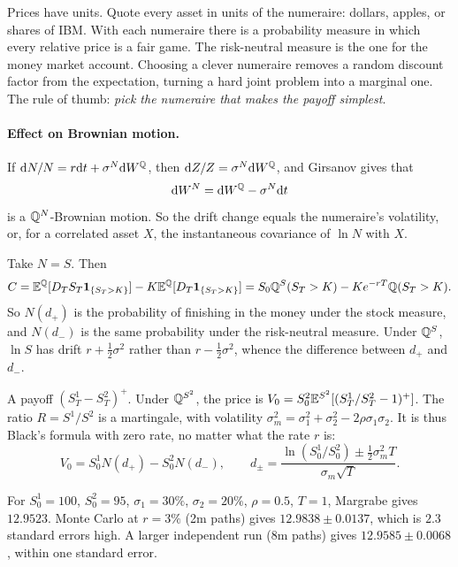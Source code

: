 \begin{intuition}
Prices have units. Quote every asset in units of the numeraire: dollars, apples, or shares of IBM. With each numeraire there is a probability measure in which every relative price is a fair game. The risk-neutral measure is the one for the money market account. Choosing a clever numeraire removes a random discount factor from the expectation, turning a hard joint problem into a marginal one. The rule of thumb: \emph{pick the numeraire that makes the payoff simplest}.
\end{intuition}

\paragraph{Effect on Brownian motion.} If $\mathrm{d} N/N=r\mathrm{d} t+\sigma^N\mathrm{d} W^{\mathbb{Q}}$, then $\mathrm{d} Z/Z=\sigma^N\mathrm{d} W^{\mathbb{Q}}$, and Girsanov gives that
\[
\mathrm{d} W^N=\mathrm{d} W^{\mathbb{Q}}-\sigma^N\mathrm{d} t
\]
is a $\mathbb{Q}^N$-Brownian motion. So the drift change equals the numeraire's volatility, or, for a correlated asset $X$, the instantaneous covariance of $\ln N$ with $X$.

\begin{example}
Take $N=S$. Then
\[
C=\mathbb{E}^{\mathbb{Q}}[D_TS_T\mathbf{1}_{\{S_T>K\}}]-K\mathbb{E}^{\mathbb{Q}}[D_T\mathbf{1}_{\{S_T>K\}}]=S_0\mathbb{Q}^S(S_T>K)-Ke^{-rT}\mathbb{Q}(S_T>K).
\]
So $N(d_+)$ is the probability of finishing in the money under the stock measure, and $N(d_-)$ is the same probability under the risk-neutral measure. Under $\mathbb{Q}^S$, $\ln S$ has drift $r+\tfrac12\sigma^2$ rather than $r-\tfrac12\sigma^2$, whence the difference between $d_+$ and $d_-$.
\end{example}

\begin{example}\label{ex:margrabe}
A payoff $(S^1_T-S^2_T)^+$. Under $\mathbb{Q}^{S^2}$, the price is $V_0=S^2_0\mathbb{E}^{S^2}[(S^1_T/S^2_T-1)^+]$. The ratio $R=S^1/S^2$ is a martingale, with volatility $\sigma_m^2=\sigma_1^2+\sigma_2^2-2\rho\sigma_1\sigma_2$. It is thus Black's formula with zero rate, no matter what the rate $r$ is:
\[
V_0=S^1_0N(d_+)-S^2_0N(d_-),\qquad d_\pm=\frac{\ln(S_0^1/S_0^2)\pm\frac12\sigma_m^2T}{\sigma_m\sqrt T}.
\]
\end{example}

\begin{numcheck}
For $S^1_0=100$, $S^2_0=95$, $\sigma_1=30\%$, $\sigma_2=20\%$, $\rho=0.5$, $T=1$, Margrabe gives $12.9523$. Monte Carlo at $r=3\%$ (2m paths) gives $12.9838\pm0.0137$, which is $2.3$ standard errors high. A larger independent run (8m paths) gives $12.9585\pm0.0068$, within one standard error.
\end{numcheck}

